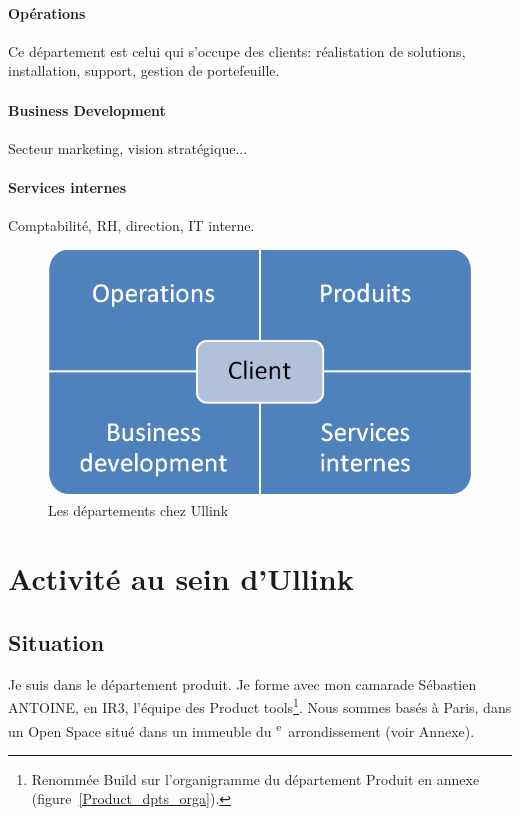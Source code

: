 \documentclass[a4paper, 12pt]{article}
\begin{document}
\paragraph{Opérations}
Ce département est celui qui s'occupe des clients: réalistation de solutions, installation, support, gestion de portefeuille.

\paragraph{Business Development}
Secteur marketing, vision stratégique...

\paragraph{Services internes}
Comptabilité, RH, direction, IT interne.

\begin{figure}
\includegraphics[width=\textwidth]{orga_deps_client.png}
\caption{Les départements chez Ullink}
\label{depts_ullink}
\end{figure}

\section{Activité au sein d'Ullink}

\subsection{Situation}

Je suis dans le département produit. Je forme avec mon camarade Sébastien ANTOINE, en IR3, l'équipe des Product tools\footnote{Renommée Build sur l'organigramme du département Produit en annexe (figure~\ref{Product_dpts_orga}).}. Nous sommes basés à Paris, dans un Open Space situé dans un immeuble du \textsc{}\textsuperscript{e}~arrondissement (voir Annexe).
\end{document}
